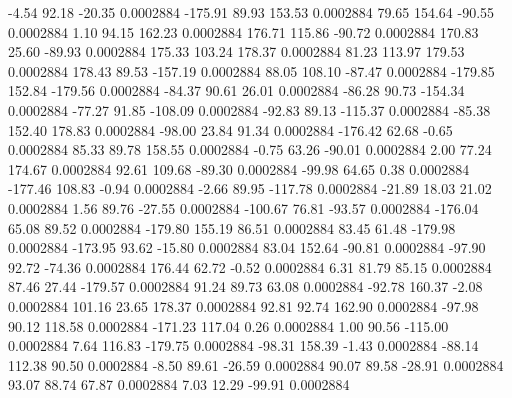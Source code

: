        -4.54       92.18      -20.35     0.0002884
     -175.91       89.93      153.53     0.0002884
       79.65      154.64      -90.55     0.0002884
        1.10       94.15      162.23     0.0002884
      176.71      115.86      -90.72     0.0002884
      170.83       25.60      -89.93     0.0002884
      175.33      103.24      178.37     0.0002884
       81.23      113.97      179.53     0.0002884
      178.43       89.53     -157.19     0.0002884
       88.05      108.10      -87.47     0.0002884
     -179.85      152.84     -179.56     0.0002884
      -84.37       90.61       26.01     0.0002884
      -86.28       90.73     -154.34     0.0002884
      -77.27       91.85     -108.09     0.0002884
      -92.83       89.13     -115.37     0.0002884
      -85.38      152.40      178.83     0.0002884
      -98.00       23.84       91.34     0.0002884
     -176.42       62.68       -0.65     0.0002884
       85.33       89.78      158.55     0.0002884
       -0.75       63.26      -90.01     0.0002884
        2.00       77.24      174.67     0.0002884
       92.61      109.68      -89.30     0.0002884
      -99.98       64.65        0.38     0.0002884
     -177.46      108.83       -0.94     0.0002884
       -2.66       89.95     -117.78     0.0002884
      -21.89       18.03       21.02     0.0002884
        1.56       89.76      -27.55     0.0002884
     -100.67       76.81      -93.57     0.0002884
     -176.04       65.08       89.52     0.0002884
     -179.80      155.19       86.51     0.0002884
       83.45       61.48     -179.98     0.0002884
     -173.95       93.62      -15.80     0.0002884
       83.04      152.64      -90.81     0.0002884
      -97.90       92.72      -74.36     0.0002884
      176.44       62.72       -0.52     0.0002884
        6.31       81.79       85.15     0.0002884
       87.46       27.44     -179.57     0.0002884
       91.24       89.73       63.08     0.0002884
      -92.78      160.37       -2.08     0.0002884
      101.16       23.65      178.37     0.0002884
       92.81       92.74      162.90     0.0002884
      -97.98       90.12      118.58     0.0002884
     -171.23      117.04        0.26     0.0002884
        1.00       90.56     -115.00     0.0002884
        7.64      116.83     -179.75     0.0002884
      -98.31      158.39       -1.43     0.0002884
      -88.14      112.38       90.50     0.0002884
       -8.50       89.61      -26.59     0.0002884
       90.07       89.58      -28.91     0.0002884
       93.07       88.74       67.87     0.0002884
        7.03       12.29      -99.91     0.0002884
